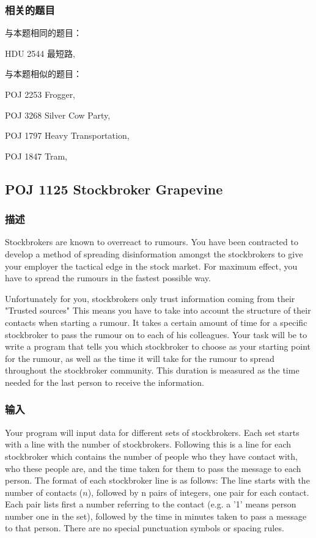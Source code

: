 \subsubsection{相关的题目}
与本题相同的题目：
\begindot
\item HDU 2544 最短路, 
\myenddot

与本题相似的题目：
\begindot
\item POJ 2253 Frogger, 
\item POJ 3268 Silver Cow Party, 
\item POJ 1797 Heavy Transportation, 
\item POJ 1847 Tram, 
\myenddot


\subsection{POJ 1125 Stockbroker Grapevine}
\subsubsection{描述}
Stockbrokers are known to overreact to rumours. You have been contracted to develop a method of spreading disinformation amongst the stockbrokers to give your employer the tactical edge in the stock market. For maximum effect, you have to spread the rumours in the fastest possible way. 

Unfortunately for you, stockbrokers only trust information coming from their "Trusted sources" This means you have to take into account the structure of their contacts when starting a rumour. It takes a certain amount of time for a specific stockbroker to pass the rumour on to each of his colleagues. Your task will be to write a program that tells you which stockbroker to choose as your starting point for the rumour, as well as the time it will take for the rumour to spread throughout the stockbroker community. This duration is measured as the time needed for the last person to receive the information.

\subsubsection{输入}
Your program will input data for different sets of stockbrokers. Each set starts with a line with the number of stockbrokers. Following this is a line for each stockbroker which contains the number of people who they have contact with, who these people are, and the time taken for them to pass the message to each person. The format of each stockbroker line is as follows: The line starts with the number of contacts ($n$), followed by n pairs of integers, one pair for each contact. Each pair lists first a number referring to the contact (e.g. a '1' means person number one in the set), followed by the time in minutes taken to pass a message to that person. There are no special punctuation symbols or spacing rules. 

